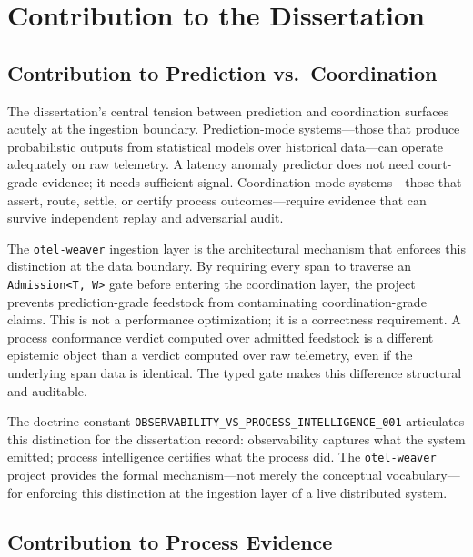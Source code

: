 
\section{Contribution to the Dissertation}
\label{sec:otel-weaver-contribution}

\subsection{Contribution to Prediction vs.~Coordination}
\label{sec:otel-weaver-contribution-prediction}

The dissertation's central tension between prediction and coordination surfaces acutely at the
ingestion boundary. Prediction-mode systems---those that produce probabilistic outputs from
statistical models over historical data---can operate adequately on raw telemetry. A latency
anomaly predictor does not need court-grade evidence; it needs sufficient signal. Coordination-mode
systems---those that assert, route, settle, or certify process outcomes---require evidence that
can survive independent replay and adversarial audit.

The \texttt{otel-weaver} ingestion layer is the architectural mechanism that enforces this
distinction at the data boundary. By requiring every span to traverse an \texttt{Admission<T,\,W>}
gate before entering the coordination layer, the project prevents prediction-grade feedstock
from contaminating coordination-grade claims. This is not a performance optimization; it is a
correctness requirement. A process conformance verdict computed over admitted feedstock is a
different epistemic object than a verdict computed over raw telemetry, even if the underlying
span data is identical. The typed gate makes this difference structural and auditable.

The doctrine constant \texttt{OBSERVABILITY\_VS\_PROCESS\_INTELLIGENCE\_001} articulates this
distinction for the dissertation record: observability captures what the system emitted;
process intelligence certifies what the process did. The \texttt{otel-weaver} project provides
the formal mechanism---not merely the conceptual vocabulary---for enforcing this distinction
at the ingestion layer of a live distributed system.

\subsection{Contribution to Process Evidence}
\label{sec:otel-weaver-contribution-evidence}

